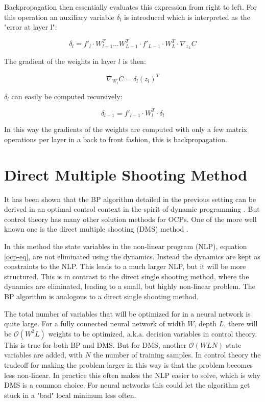 Backpropagation then essentially evaluates this expression from right to left. For this operation an auxiliary variable $\delta_l$ is introduced which is interpreted as the "error at layer l":

\begin{equation}
\delta_l = f'_l \cdot W_{l+1}^T \dots W_{L-1}^T \cdot f'_{L-1} \cdot W_L^T \cdot \nabla_{z_L}C
\end{equation}

The gradient of the weights in layer $l$ is then:

\begin{equation}
\nabla_{W_l}C=\delta_l(z_l)^T
\end{equation}

$\delta_l$ can easily be computed recursively:

\begin{equation}
\delta_{l-1}  = f'_{l-1} \cdot W_l^T \cdot \delta_l
\end{equation}

In this way the gradients of the weights are computed with only a few matrix operations per layer in a back to front fashion, this is backpropagation.


\section{Direct Multiple Shooting Method}
It has been shown that the BP algorithm detailed in the previous setting can be derived in an optimal control context in the spirit of dynamic programming \cite{mizutani2000}. But control theory has many other solution methods for OCPs. One of the more well known one is the direct multiple shooting (DMS) method \cite{bock1984multiple}.

In this method the state variables in the non-linear program (NLP), equation \ref{ocp-eq}, are not eliminated using the dynamics. Instead the dynamics are kept as constraints to the NLP. This leads to a much larger NLP, but it will be more structured. This is in contrast to the direct single shooting method, where the dynamics are eliminated, leading to a small, but highly non-linear problem. The BP algorithm is analogous to a direct single shooting method.

The total number of variables that will be optimized for in a neural network is quite large. For a fully connected neural network of width $W$, depth $L$, there will be $\mathcal{O}(W^2L)$ weights to be optimized, a.k.a. decision variables in control theory. This is true for both BP and DMS. But for DMS, another $\mathcal{O}(WLN)$ state variables are added, with $N$ the number of training samples. In control theory the tradeoff for making the problem larger in this way is that the problem becomes less non-linear. In practice this often makes the NLP easier to solve, which is why DMS is a common choice. For neural networks this could let the algorithm get stuck in a "bad" local minimum less often.


